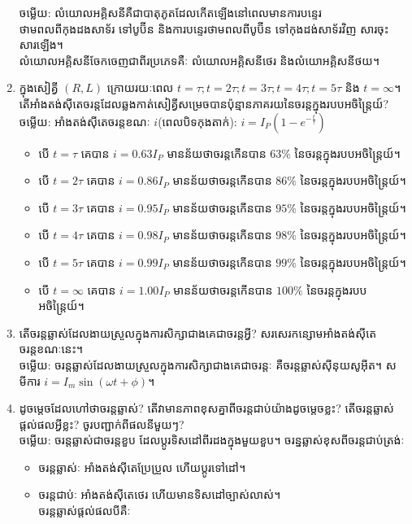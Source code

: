 \documentclass{officialexam}
\begin{document}
\begin{enumerate}[m]
		{\color{red}\sffamily ចម្លើយ}: លំយោលអគ្គិសនី​ គឺជាបាតុភូតដែលកើតឡើងនៅពេលមានការបន្ទេរថាមពលពីកុងដងសាទ័រ ទៅបូប៊ីន និងការបន្ទេរថាមពលពីបូប៊ីន ទៅកុងដង់សាទ័រវិញ សារចុះ សារឡើង។\\ លំយោលអគ្គិសនីចែកចេញជាពីរប្រភេទគឺៈ លំយោលអគ្គិសនីថេរ និងលំយោអគ្គិសនីថយ។
		\item ក្នុងសៀគ្វី $\left(R,L\right)$ ក្រោយរយៈពេល $t=\tau; t=2\tau; t=3\tau; t=4\tau; t=5\tau$ និង $t=\infty$។ តើអាំងតង់សុីតេចរន្តដែលឆ្លងកាត់សៀគ្វីសម្រេចបានប៉ុន្មានភាគរយនៃចរន្តក្នុងរបបអចិន្រៃ្តយ៍?\\
		{\color{red}\sffamily ចម្លើយ}: អាំងតង់សុីតេចរន្តខណៈ $i$(ពេលបិទកុងតាក់): $i=I_{P}\left(1-e^{-\frac{t}{\tau}}\right)$
		\begin{itemize}
			\item បើ $t=\tau$ គេបាន $i=0.63I_{P}$ មានន័យថាចរន្តកើនបាន $63\%$ នៃចរន្តក្នុងរបបអចិន្ត្រៃយ៍។
			\item បើ $t=2\tau$ គេបាន $i=0.86I_{P}$ មានន័យថាចរន្តកើនបាន $86\%$ នៃចរន្តក្នុងរបបអចិន្ត្រៃយ៍។
			\item បើ $t=3\tau$ គេបាន $i=0.95I_{P}$ មានន័យថាចរន្តកើនបាន $95\%$ នៃចរន្តក្នុងរបបអចិន្ត្រៃយ៍។
			\item បើ $t=4\tau$ គេបាន $i=0.98I_{P}$ មានន័យថាចរន្តកើនបាន $98\%$ នៃចរន្តក្នុងរបបអចិន្ត្រៃយ៍។
			\item បើ $t=5\tau$ គេបាន $i=0.99I_{P}$ មានន័យថាចរន្តកើនបាន $99\%$ នៃចរន្តក្នុងរបបអចិន្ត្រៃយ៍។
			\item បើ $t=\infty$ គេបាន $i=1.00I_{P}$ មានន័យថាចរន្តកើនបាន $100\%$ នៃចរន្តក្នុងរបបអចិន្ត្រៃយ៍។
		\end{itemize}
		\item តើចរន្តឆ្លាស់ដែលងាយស្រួលក្នុងការសិក្សាជាងគេជាចរន្តអ្វី? សរសេរកន្សោមអាំងតង់សុីតេចរន្តខណៈនេះ។\\
		{\color{red}\sffamily ចម្លើយ}: ចរន្តឆ្លាស់ដែលងាយស្រួលក្នុងការសិក្សាជាងគេជាចរន្តៈ គឺចរន្តឆ្លាស់សុីនុយសូអុីត។ សមីការ $i=I_{m}\sin\left(\omega t+\phi\right)$។
		\item ដូចម្តេចដែលហៅថាចរន្តឆ្លាស់? តើវាមានភាពខុសគ្នាពីចរន្តជាប់យ៉ាងដូចម្តេចខ្លះ? តើចរន្តឆ្លាស់ផ្តល់ផលអ្វីខ្លះ? ចូរបញ្ជាក់ពីផលនីមួយៗ?\\
		{\color{red}\sffamily ចម្លើយ}: ចរន្តឆ្លាស់ជាចរន្តខួប ដែលប្តូរទិសដៅពីរដងក្នុងមួយខួប។ ចរន្នឆ្លាស់ខុសពីចរន្តជាប់ត្រង់ៈ
		\begin{itemize}
			\item ចរន្តឆ្លាស់ៈ អាំងតង់សុីតេប្រែប្រួល ហើយប្តូរទៅដៅ។
			\item ចរន្តជាប់ៈ អាំងតង់សុីតេថេរ ហើយមានទិសដៅច្បាស់លាស់។\\
			ចរន្តឆ្លាស់ផ្តល់ផលបីគឺៈ

\end{itemize}
\end{enumerate}
\end{document}
